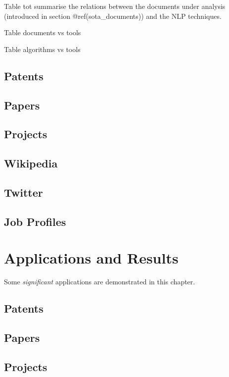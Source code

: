 \documentclass[]{book}
\begin{document}
Table tot summarise the relations between the documents under analysis
(introduced in section @ref(sota\_documents)) and the NLP techniques.

Table documents vs tools

Table algorithms vs tools

\section{Patents}\label{patents}

\section{Papers}\label{papers}

\section{Projects}\label{projects}

\section{Wikipedia}\label{wikipedia}

\section{Twitter}\label{twitter}

\section{Job Profiles}\label{job-profiles}

\chapter{Applications and Results}\label{applications-and-results}

Some \emph{significant} applications are demonstrated in this chapter.

\section{Patents}\label{patents-1}

\section{Papers}\label{papers-1}

\section{Projects}\label{projects-1}
\end{document}
